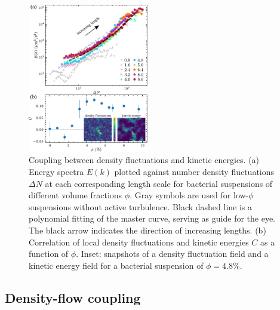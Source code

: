 \documentclass[twocolumn,aps,prx,amsmath,amssymb,longbibliography]{revtex4-2}
\begin{document}
\begin{figure}[t]
\begin{center}
\includegraphics[width=0.47\textwidth]{figures/fig-5.pdf}
\caption[The correlation between GNF and kinetic energy and kinetic energy spectra.]
{
Coupling between density fluctuations and kinetic energies.
(a) Energy spectra $E(k)$ plotted against number density fluctuations $\Delta N$ at each corresponding length scale for bacterial suspensions of different volume fractions $\phi$. Gray symbols are used for low-$\phi$ suspensions without active turbulence. Black dashed line is a polynomial fitting of the master curve, serving as guide for the eye. The black arrow indicates the direction of increasing lengths.
(b) Correlation of local density fluctuations and kinetic energies $C$ as a function of $\phi$. Inset: snapshots of a density fluctuation field and a kinetic energy field for a bacterial suspension of $\phi = 4.8\%$.
}
\label{fig:GNF-energy-spectra-correlation}
\end{center}
\end{figure}

\subsection{Density-flow coupling} \label{Density-flow coupling}
\end{document}

